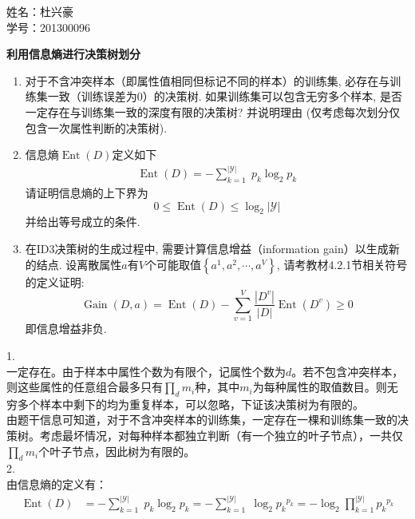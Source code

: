 \documentclass[answers]{exam}  %
\begin{document}
\Large
\noindent 
姓名：杜兴豪 \\
学号：201300096 \\
\begin{questions}
\question [20] \textbf{利用信息熵进行决策树划分}

\begin{enumerate}
    \item  对于不含冲突样本（即属性值相同但标记不同的样本）的训练集, 必存在与训练集一致（训练误差为0）的决策树. 如果训练集可以包含无穷多个样本, 是否一定存在与训练集一致的深度有限的决策树? 并说明理由 (仅考虑每次划分仅包含一次属性判断的决策树).
    \item 
    信息熵$\operatorname{Ent}(D)$定义如下
    \begin{align}
        \operatorname{Ent}(D)=-\sum_{k=1}^{|\mathcal{Y}|}\; p_{k} \log_{2} p_{k}\label{ch4_eq:entropy}
    \end{align}
    请证明信息熵的上下界为
     \begin{equation}
        0 \leq \operatorname{Ent}(D)\leq \log _{2}|\mathcal{Y}|
    \end{equation}
    并给出等号成立的条件. 
	\item  在ID3决策树的生成过程中, 需要计算信息增益（information gain）以生成新的结点. 设离散属性$a$有$V$个可能取值$\left\{a^{1}, a^{2}, \cdots, a^{V}\right\}$, 请考教材4.2.1节相关符号的定义证明:
    \begin{equation}
        \operatorname{Gain}(D, a)=\operatorname{Ent}(D)-\sum_{v=1}^{V} \frac{\left|D^{v}\right|}{|D|} \operatorname{Ent}\left(D^{v}\right) \geq 0
    \end{equation}
    即信息增益非负.
\end{enumerate}
	\begin{solution}
		1.\\
        一定存在。由于样本中属性个数为有限个，记属性个数为$d$。若不包含冲突样本，则这些属性的任意组合最多只有$\prod_{d}m_i$种，其中$m_i$为每种属性的取值数目。则无穷多个样本中剩下的均为重复样本，可以忽略，下证该决策树为有限的。\\
        由题干信息可知道，对于不含冲突样本的训练集，一定存在一棵和训练集一致的决策树。考虑最坏情况，对每种样本都独立判断（有一个独立的叶子节点），一共仅$\prod_dm_i$个叶子节点，因此树为有限的。\\
        2.\\
        由信息熵的定义有：
        $$\begin{aligned}
            \operatorname{Ent}(D)&=-\sum_{k=1}^{|\mathcal Y |}\; p_{k}\log_{2}p_{k}=-\sum_{k=1}^{|\mathcal Y |}\;\log_2{p_{k}}^{p_k}=-\log_2\prod_{k=1}^{|\mathcal Y|}{p_k}^{p_k}

\end{aligned}$$
\end{solution}
\end{questions}
\end{document}

